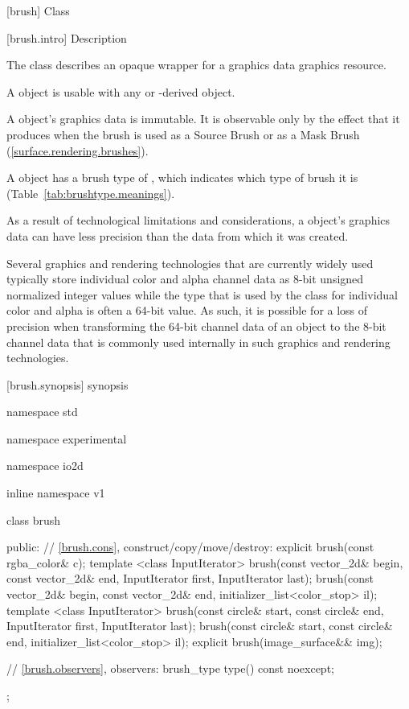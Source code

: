  [brush] {Class }

 [brush.intro] { Description}

\pnum
{}
The class  describes an opaque wrapper for a graphics data graphics resource.

\pnum
A  object is usable with any  or -derived object.

\pnum
A  object's graphics data is immutable. It is observable only by the effect that it produces when the brush is used as a Source Brush or as a Mask Brush (\ref{surface.rendering.brushes}).

\pnum
A  object has a brush type of , which indicates which type of brush it is (Table~\ref{tab:brushtype.meanings}).

\pnum
As a result of technological limitations and considerations, a  object's graphics data can have less precision than the data from which it was created.

\pnum
\begin{example}
Several graphics and rendering technologies that are currently widely used typically store individual color and alpha channel data as 8-bit unsigned normalized integer values while the  type that is used by the  class for individual color and alpha is often a 64-bit value. As such, it is possible for a loss of precision when transforming the 64-bit channel data of an  object to the 8-bit channel data that is commonly used internally in such graphics and rendering technologies.
\end{example}

 [brush.synopsis] { synopsis}

\begin{codeblock}
namespace std { namespace experimental { namespace io2d { inline namespace v1 {
  class brush {
  public:
    // \ref{brush.cons}, construct/copy/move/destroy:
    explicit brush(const rgba_color& c);
    template <class InputIterator>
    brush(const vector_2d& begin, const vector_2d& end,
      InputIterator first, InputIterator last);
    brush(const vector_2d& begin, const vector_2d& end,
      initializer_list<color_stop> il);
    template <class InputIterator>
    brush(const circle& start, const circle& end,
      InputIterator first, InputIterator last);
    brush(const circle& start, const circle& end,
      initializer_list<color_stop> il);
    explicit brush(image_surface&& img);

    // \ref{brush.observers}, observers:
    brush_type type() const noexcept;
  };
} } } }
\end{codeblock}

